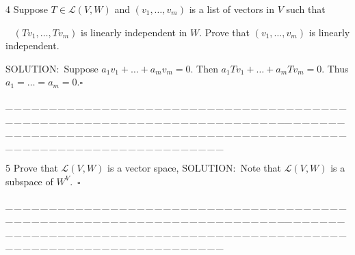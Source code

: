 \documentclass[a4paper, 11pt, UTF8]{article}
\def\Lm{\mathcal{L}}
\begin{document}
\begin{large}
{\timesbf\Large 4} {\timessl\Large 
Suppose $T\in\Lm(V,W)$ and $(v_1,\dots,v_m)$ is a list of vectors in $V$ such that}\par\,\,\,
{\timessl\Large $(Tv_1,\dots,Tv_m)$ is linearly independent in $W$. Prove that $(v_1,\dots,v_m)$ is linearly independent.
}\par
{\timesbf S\footnotesize{OLUTION:}}\,\,\,Suppose $a_1 v_1+\dots+a_m v_m=0$. Then $a_1 Tv_1+\dots+a_m Tv_m=0$. Thus $a_1=\dots=a_m=0.\square$\par
{\tiny \_\,\_\,\_\,\_\,\_\,\_\,\_\,\_\,\_\,\_\,\_\,\_\,\_\,\_\,\_\,\_\,\_\,\_\,\_\,\_\,\_\,\_\,\_\,\_\,\_\,\_\,\_\,\_\,\_\,\_\,\_\,\_\,\_\,\_\,\_\,\_\,\_\,\_\,\_\,\_\,\_\,\_\,\_\,\_\,\_\,\_\,\_\,\_\,\_\,\_\,\_\,\_\,\_\,\_\,\_\,\_\,\_\,\_\,\_\,\_\,\_\,\_\,\_\,\_\,\_\,\_\,\_\,\_\,\_\,\_\,\_\_\,\_\,\_\,\_\,\_\,\_\,\_\,\_\,\_\,\_\,\_\,\_\,\_\,\_\,\_\,\_\,\_\,\_\,\_\,\_\,\_\,\_\,\_\,\_\,\_\,\_\,\_\,\_\,\_\,\_\,\_\,\_\,\_\,\_\,\_\,\_\,\_\,\_\,\_\,\_\,\_\,\_\,\_\,\_\,\_\,\_\,\_\,\_\,\_\,\_\,\_\,\_\,\_\,\_\,\_\,\_\,\_\,\_\,\_\,\_\,\_\,\_\,\_\,\_\,\_\,\_\,\_\,\_\,\_\,\_\,\_}\par

{\timesbf\Large 5} {\timessl\Large 
Prove that $\Lm(V, W)$ is a vector space,
} {\timesbf S\footnotesize{OLUTION:}}\,\,\,Note that $\Lm(V, W)$ is a subspace of $W^V$.$\,\,\,\square$\par
{\tiny \_\,\_\,\_\,\_\,\_\,\_\,\_\,\_\,\_\,\_\,\_\,\_\,\_\,\_\,\_\,\_\,\_\,\_\,\_\,\_\,\_\,\_\,\_\,\_\,\_\,\_\,\_\,\_\,\_\,\_\,\_\,\_\,\_\,\_\,\_\,\_\,\_\,\_\,\_\,\_\,\_\,\_\,\_\,\_\,\_\,\_\,\_\,\_\,\_\,\_\,\_\,\_\,\_\,\_\,\_\,\_\,\_\,\_\,\_\,\_\,\_\,\_\,\_\,\_\,\_\,\_\,\_\,\_\,\_\,\_\,\_\_\,\_\,\_\,\_\,\_\,\_\,\_\,\_\,\_\,\_\,\_\,\_\,\_\,\_\,\_\,\_\,\_\,\_\,\_\,\_\,\_\,\_\,\_\,\_\,\_\,\_\,\_\,\_\,\_\,\_\,\_\,\_\,\_\,\_\,\_\,\_\,\_\,\_\,\_\,\_\,\_\,\_\,\_\,\_\,\_\,\_\,\_\,\_\,\_\,\_\,\_\,\_\,\_\,\_\,\_\,\_\,\_\,\_\,\_\,\_\,\_\,\_\,\_\,\_\,\_\,\_\,\_\,\_\,\_\,\_\,\_}\par


\end{large}
\end{document}
